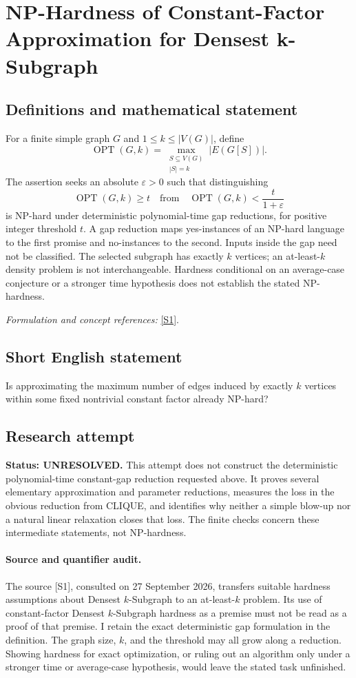 \documentclass[11pt]{article}
\begin{document}
\section*{\texorpdfstring{NP-Hardness of Constant-Factor Approximation for Densest k-Subgraph}{NP-Hardness of Constant-Factor Approximation for Densest k-Subgraph}}\label{30006892}
\subsection{Definitions and mathematical statement}
For a finite simple graph $G$ and $1\le k\le|V(G)|$, define
\[
 \operatorname{OPT}(G,k)=\max_{\substack{S\subseteq V(G)\\|S|=k}}|E(G[S])|.
\]
The assertion seeks an absolute ${\varepsilon}>0$ such that distinguishing
\[
 \operatorname{OPT}(G,k)\ge t
 \quad\text{from}\quad
 \operatorname{OPT}(G,k)<\frac{t}{1+{\varepsilon}}
\]
is NP-hard under deterministic polynomial-time gap reductions, for positive integer threshold $t$. A gap reduction maps yes-instances of an NP-hard language to the first promise and no-instances to the second. Inputs inside the gap need not be classified. The selected subgraph has exactly $k$ vertices; an at-least-$k$ density problem is not interchangeable. Hardness conditional on an average-case conjecture or a stronger time hypothesis does not establish the stated NP-hardness.
\par\smallskip\textit{Formulation and concept references:} \href{https://arxiv.org/html/2605.25464v1}{[S1]}.

\subsection{Short English statement}
Is approximating the maximum number of edges induced by exactly $k$ vertices within some fixed nontrivial constant factor already NP-hard?
\subsection{Research attempt}
\textbf{Status: UNRESOLVED.} This attempt does not construct the deterministic polynomial-time constant-gap reduction requested above. It proves several elementary approximation and parameter reductions, measures the loss in the obvious reduction from CLIQUE, and identifies why neither a simple blow-up nor a natural linear relaxation closes that loss. The finite checks concern these intermediate statements, not NP-hardness.

\paragraph{Source and quantifier audit.}
The source [S1], consulted on 27 September 2026, transfers suitable hardness assumptions about Densest $k$-Subgraph to an at-least-$k$ problem. Its use of constant-factor Densest $k$-Subgraph hardness as a premise must not be read as a proof of that premise. I retain the exact deterministic gap formulation in the definition. The graph size, $k$, and the threshold may all grow along a reduction. Showing hardness for exact optimization, or ruling out an algorithm only under a stronger time or average-case hypothesis, would leave the stated task unfinished.
\end{document}
